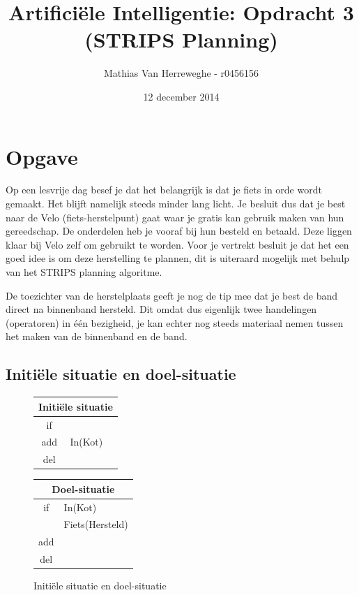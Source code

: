 \documentclass{article}
\title{Artificiële Intelligentie: Opdracht 3 (STRIPS Planning)}
\author{Mathias Van Herreweghe - r0456156}
\date{12 december 2014}
\begin{document}
\maketitle
\newpage

\section{Opgave}
Op een lesvrije dag besef je dat het belangrijk is dat je fiets in orde wordt gemaakt. Het blijft namelijk steeds minder lang licht. Je besluit dus dat je best naar de Velo (fiets-herstelpunt) gaat waar je gratis kan gebruik maken van hun gereedschap. De onderdelen heb je vooraf bij hun besteld en betaald. Deze liggen klaar bij Velo zelf om gebruikt te worden. Voor je vertrekt besluit je dat het een goed idee is om deze herstelling te plannen, dit is uiteraard mogelijk met behulp van het STRIPS planning algoritme.

De toezichter van de herstelplaats geeft je nog de tip mee dat je best de band direct na binnenband hersteld. Dit omdat dus eigenlijk twee handelingen (operatoren) in één bezigheid, je kan echter nog steeds materiaal nemen tussen het maken van de binnenband en de band.

\subsection{Initiële situatie en doel-situatie}

\begin{figure}[H]
\centering
\begin{tabular}{|c|l|}
    \multicolumn{2}{c}{Initiële situatie}\\
    \hline
    if & \\
    \hline
    add & In(Kot)\\
    \hline
    del & \\
    \hline
\end{tabular}
\hspace{0.25 cm}
\begin{tabular}{|c|l|}
    \multicolumn{2}{c}{Doel-situatie}\\
    \hline
    if & In(Kot)\\
       & Fiets(Hersteld)\\
    \hline
    add & \\
    \hline
    del & \\
    \hline
\end{tabular}
\caption{Initiële situatie en doel-situatie}
\label{initialfinal_s}
\end{figure}
\end{document}
